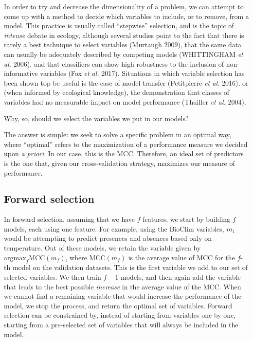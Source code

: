 \documentclass[
  letterpaper,
]{scrbook}
\begin{document}
In order to try and decrease the dimensionality of a problem, we can
attempt to come up with a method to decide which variables to include,
or to remove, from a model. This practice is usually called ``stepwise''
selection, and is the topic of \emph{intense} debate in ecology,
although several studies point to the fact that there is rarely a best
technique to select variables (Murtaugh 2009), that the same data can
usually be adequately described by competing models (WHITTINGHAM
\emph{et al.} 2006), and that classifiers can show high robustness to
the inclusion of non-informative variables (Fox \emph{et al.} 2017).
Situations in which variable selection has been shown top be useful is
the case of model transfer (Petitpierre \emph{et al.} 2016), or (when
informed by ecological knowledge), the demonstration that classes of
variables had no measurable impact on model performance (Thuiller
\emph{et al.} 2004).

Why, so, should we select the variables we put in our models?

The answer is simple: we seek to solve a specific problem in an optimal
way, where ``optimal'' refers to the maximization of a performance
measure we decided upon \emph{a priori}. In our case, this is the MCC.
Therefore, an ideal set of predictors is the one that, given our
cross-validation strategy, maximizes our measure of performance.

\subsection{Forward selection}\label{forward-selection}

In forward selection, assuming that we have \(f\) features, we start by
building \(f\) models, each using one feature. For example, using the
BioClim variables, \(m_1\) would be attempting to predict presences and
absences based only on temperature. Out of these models, we retain the
variable given by \(\text{argmax}_f \text{MCC}(m_f)\), where
\(\text{MCC}(m_f)\) is the average value of MCC for the \(f\)-th model
on the validation datasets. This is the first variable we add to our set
of selected variables. We then train \(f-1\) models, and then again add
the variable that leads to the best possible \emph{increase} in the
average value of the MCC. When we cannot find a remaining variable that
would increase the performance of the model, we stop the process, and
return the optimal set of variables. Forward selection can be
constrained by, instead of starting from variables one by one, starting
from a pre-selected set of variables that will always be included in the
model.
\end{document}

